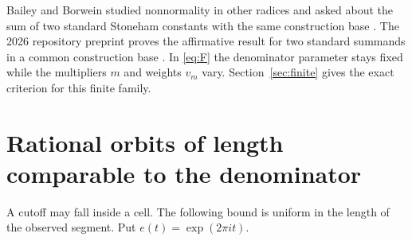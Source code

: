 \documentclass[11pt]{article}
\begin{document}
Bailey and Borwein studied nonnormality in other radices and asked about the sum of two standard Stoneham constants with the same construction base \cite{bb}. The 2026 repository preprint proves the affirmative result for two standard summands in a common construction base \cite{twosum}. In \eqref{eq:F} the denominator parameter stays fixed while the multipliers \(m\) and weights \(v_m\) vary. Section~\ref{sec:finite} gives the exact criterion for this finite family.

\section{Rational orbits of length comparable to the denominator}\label{sec:orbits}
A cutoff may fall inside a cell. The following bound is uniform in the length of the observed segment. Put \(e(t)=\exp(2\pi i t)\).
\end{document}
